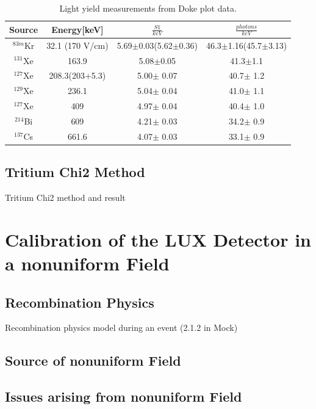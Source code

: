 \documentclass[a4paper,12pt]{article}
\begin{document}
{\begin{center}
\begin{table}[H]
\begin{tabular}{ | c | c | c | c |}
\hline
Source & Energy[keV] & $\frac{S1}{keV}$ & $\frac{photons}{keV}$ \\ \hline
$^{83m}$Kr & 32.1 (170 V/cm) & 5.69$\pm$0.03(5.62$\pm$0.36) & 46.3$\pm$1.16(45.7$\pm$3.13) \\  \hline
$^{131}$Xe & 163.9 & 5.08$\pm$0.05 & 41.3$\pm$1.1\\  \hline
$^{127}$Xe & 208.3(203+5.3) & 5.00$\pm$ 0.07 & 40.7$\pm$ 1.2\\  \hline
$^{129}$Xe & 236.1 & 5.04$\pm$ 0.04 & 41.0$\pm$ 1.1\\  \hline
$^{127}$Xe & 409 & 4.97$\pm$ 0.04 & 40.4$\pm$ 1.0\\  \hline
$^{214}$Bi & 609 & 4.21$\pm$ 0.03 & 34.2$\pm$ 0.9\\  \hline
$^{137}$Cs & 661.6 & 4.07$\pm$ 0.03 & 33.1$\pm$ 0.9\\ 
\hline
\end{tabular}
\caption{Light yield measurements from Doke plot data.}
\label{LY}
\end{table}
\end{center}


\subsection{Tritium Chi2 Method}
	Tritium Chi2 method and result


\section{Calibration of the LUX Detector in a nonuniform Field} \label{Run04Corrections}

\subsection{Recombination Physics} \label{RecombSec} 
Recombination physics model  during an event (2.1.2 in Mock)
\subsection{Source of nonuniform Field}
\subsection{Issues arising from nonuniform Field}
}
\end{document}
